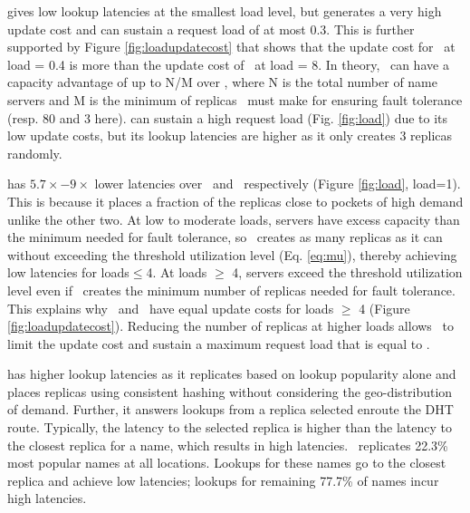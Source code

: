 {\em{\replicateall}}   gives low lookup latencies at the smallest load level, but generates a very high update cost and can sustain a request load of at most 0.3. This is further supported by  Figure \ref{fig:loadupdatecost} that shows that the update cost for \replicateall\ at load = 0.4 is more than the update cost of \auspice\  at load = 8. In theory, \auspice\ can have a capacity advantage of up to N/M over \replicateall, where N is the total number of name servers and M is the minimum of replicas \auspice\ must make for ensuring fault tolerance (resp. 80 and 3 here). {\em{\staticthree}} can sustain a high request load (Fig. \ref{fig:load}) due to its low update costs, but its lookup latencies are higher as it only creates 3 replicas randomly. %

{\em{\auspice}}  has $5.7\times-9\times$ lower latencies over \staticthree\ and \codons\ respectively (Figure \ref{fig:load}, load=1). This is because it places a fraction of the replicas close to pockets of high demand unlike the other two.  At low to moderate loads, servers have excess capacity than the minimum needed for fault tolerance, so \auspice\ creates as many replicas as it can without exceeding the threshold utilization level (Eq. \ref{eq:mu}), thereby  achieving low latencies for loads$\leq$4. 
At loads $\geq$ 4, servers exceed the threshold utilization level even if \auspice\ creates the minimum number of replicas needed for fault tolerance. This explains why \auspice\ and \staticthree\ have equal update costs for loads $\geq$ 4 (Figure \ref{fig:loadupdatecost}). Reducing the number of replicas at higher loads allows \auspice\ to limit the update cost and sustain a maximum request load that is equal to \staticthree. 

{\em{\codons}}  has higher lookup latencies as it replicates based on lookup popularity alone and places replicas using consistent hashing without considering the geo-distribution of demand. Further, it answers lookups from a replica selected enroute the DHT route. Typically, the latency to the selected replica  is higher than the latency to the closest replica for a name, which results in high latencies.  \codons\ replicates 22.3\%   most popular names at all locations. Lookups for these names go to the closest replica and achieve low latencies; lookups for remaining 77.7\% of names incur high latencies.

